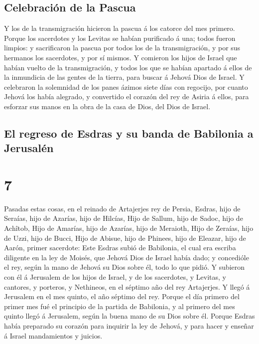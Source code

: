 \hypertarget{celebraciuxf3n-de-la-pascua}{%
\subsection{Celebración de la
Pascua}\label{celebraciuxf3n-de-la-pascua}}

 Y los de la transmigración hicieron la pascua á los
catorce del mes primero.  Porque los sacerdotes y los
Levitas se habían purificado á una; todos fueron limpios: y sacrificaron
la pascua por todos los de la transmigración, y por sus hermanos los
sacerdotes, y por sí mismos.  Y comieron los hijos de
Israel que habían vuelto de la transmigración, y todos los que se habían
apartado á ellos de la inmundicia de las gentes de la tierra, para
buscar á Jehová Dios de Israel.  Y celebraron la
solemnidad de los panes ázimos siete días con regocijo, por cuanto
Jehová los había alegrado, y convertido el corazón del rey de Asiria á
ellos, para esforzar sus manos en la obra de la casa de Dios, del Dios
de Israel.

\hypertarget{el-regreso-de-esdras-y-su-banda-de-babilonia-a-jerusaluxe9n}{%
\subsection{El regreso de Esdras y su banda de Babilonia a
Jerusalén}\label{el-regreso-de-esdras-y-su-banda-de-babilonia-a-jerusaluxe9n}}

\hypertarget{section-6}{%
\section{7}\label{section-6}}

 Pasadas estas cosas, en el reinado de Artajerjes rey de
Persia, Esdras, hijo de Seraías, hijo de Azarías, hijo de Hilcías,
 Hijo de Sallum, hijo de Sadoc, hijo de Achîtob,
 Hijo de Amarías, hijo de Azarías, hijo de Meraioth,
 Hijo de Zeraías, hijo de Uzzi, hijo de Bucci,
 Hijo de Abisue, hijo de Phinees, hijo de Eleazar, hijo de
Aarón, primer sacerdote:  Este Esdras subió de Babilonia,
el cual era escriba diligente en la ley de Moisés, que Jehová Dios de
Israel había dado; y concedióle el rey, según la mano de Jehová su Dios
sobre él, todo lo que pidió.  Y subieron con él á
Jerusalem de los hijos de Israel, y de los sacerdotes, y Levitas, y
cantores, y porteros, y Nethineos, en el séptimo año del rey Artajerjes.
 Y llegó á Jerusalem en el mes quinto, el año séptimo del
rey.  Porque el día primero del primer mes fué el
principio de la partida de Babilonia, y al primero del mes quinto llegó
á Jerusalem, según la buena mano de su Dios sobre él. 
Porque Esdras había preparado su corazón para inquirir la ley de Jehová,
y para hacer y enseñar á Israel mandamientos y juicios.

